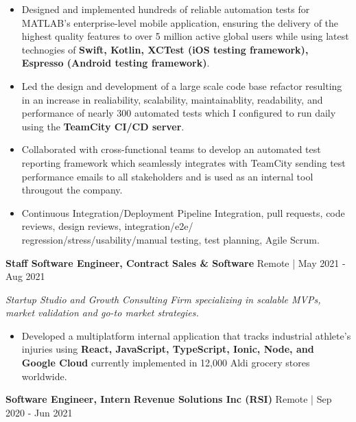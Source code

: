 \documentclass[10pt]{article}
\begin{document}
\begin{itemize}[noitemsep]
    \item Designed and implemented hundreds of reliable automation tests for MATLAB's enterprise-level mobile application,
    ensuring the delivery of the highest quality features to over 5 million active global users while using
    latest technogies of \textbf{Swift, Kotlin, XCTest (iOS testing framework), Espresso (Android testing framework)}.
    \item Led the design and development of a large scale code base refactor resulting in an increase in realiability,
    scalability, maintainablity, readability, and performance of nearly 300 automated tests which I configured to run daily using the \textbf{TeamCity CI/CD server}.
    \item Collaborated with cross-functional teams to develop an automated test reporting framework which seamlessly integrates with TeamCity sending test performance emails to all stakeholders
    and is used as an internal tool througout the company.
    \item Continuous Integration/Deployment Pipeline Integration, pull requests, code reviews, design reviews, integration/e2e/\\regression/stress/usability/manual testing, test planning, Agile Scrum.
\end{itemize}

\vspace{1pt}

\textbf{Staff Software Engineer, Contract} \hfill \textbf{Sales \& Software} \hfill Remote | May 2021 - Aug 2021

\textit{Startup Studio and Growth Consulting Firm specializing in scalable MVPs, market validation and go-to market strategies.}

\vspace{1pt}

\begin{itemize}[noitemsep]
    \item Developed a multiplatform internal application that tracks industrial athlete's injuries using \textbf{React, JavaScript, TypeScript, Ionic, Node, and Google Cloud} currently 
    implemented in 12,000 Aldi grocery stores worldwide.
\end{itemize}

\vspace{1pt}

\textbf{Software Engineer, Intern} \hfill \textbf{Revenue Solutions Inc (RSI)} \hfill Remote | Sep 2020 - Jun 2021
\end{document}
